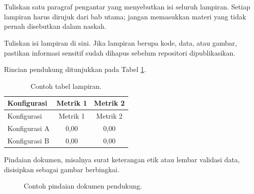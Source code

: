 \appendix
\ThesisPageBreak
{}
{}
\chapter*{\AppendixLabel}

\setcounter{table}{0}
\setcounter{figure}{0}
\renewcommand{\thetable}{L.\arabic{table}}
\renewcommand{\thefigure}{L.\arabic{figure}}


Tuliskan satu paragraf pengantar yang menyebutkan isi seluruh lampiran. Setiap lampiran harus dirujuk dari bab utama; jangan memasukkan materi yang tidak pernah disebutkan dalam naskah.


\label{sec:lampiran-contoh}
Tuliskan isi lampiran di sini. Jika lampiran berupa kode, data, atau gambar, pastikan informasi sensitif sudah dihapus sebelum repositori dipublikasikan.

\label{sec:lampiran-contoh-sub}
Rincian pendukung ditunjukkan pada Tabel \ref{tab:lampiran-contoh}.

\begin{longtable}{|l|c|c|}
\caption{Contoh tabel lampiran.}\label{tab:lampiran-contoh}\\
\hline
Konfigurasi & Metrik 1 & Metrik 2 \\
\hline
\endfirsthead
\hline
Konfigurasi & Metrik 1 & Metrik 2 \\
\hline
\endhead
\hline
\endlastfoot
Konfigurasi A & 0,00 & 0,00 \\
\hline
Konfigurasi B & 0,00 & 0,00 \\
\end{longtable}

\label{sec:lampiran-dokumen}
Pindaian dokumen, misalnya surat keterangan etik atau lembar validasi data, disisipkan sebagai gambar berbingkai.

\begin{figure}[H]
\centering
{}
\caption{Contoh pindaian dokumen pendukung.}
\label{fig:lampiran-dokumen}
\end{figure}
